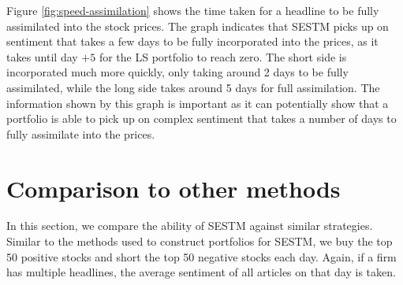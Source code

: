 Figure \ref{fig:speed-assimilation} shows the time taken for a headline to be fully assimilated into the stock prices. The graph indicates that SESTM picks up on sentiment that takes a few days to be fully incorporated into the prices, as it takes until day $+ 5$ for the LS portfolio to reach zero. The short side is incorporated much more quickly, only taking around 2 days to be fully assimilated, while the long side takes around 5 days for full assimilation. The information shown by this graph is important as it can potentially show that a portfolio is able to pick up on complex sentiment that takes a number of days to fully assimilate into the prices.


\section{Comparison to other methods}
\label{sec:comparison}

In this section, we compare the ability of SESTM against similar strategies. Similar to the methods used to construct portfolios for SESTM, we buy the top 50 positive stocks and short the top 50 negative stocks each day. Again, if a firm has multiple headlines, the average sentiment of all articles on that day is taken.

